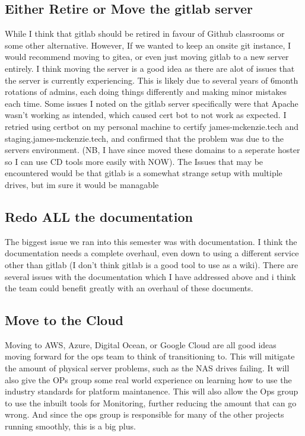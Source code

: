\documentclass{article}
\begin{document}
\subsection{Either Retire or Move the gitlab server}
While I think that gitlab should be retired in favour of Github classrooms or some other alternative. However, If we wanted to keep an onsite git instance, I would 
recommend moving to gitea, or even just moving gitlab to a new server entirely. I think moving the server is a good idea as there are alot of issues that the 
server is currently experiencing. This is likely due to several years of 6month rotations of admins, each doing things differently and making minor 
mistakes each time. Some issues I noted on the gitlab server specifically were that Apache wasn't working as intended, which caused cert bot to not work as
expected. I retried using certbot on my personal machine to certify james-mckenzie.tech and staging.james-mckenzie.tech, and confirmed that the problem was due to
the servers environment. (NB, I have since moved these domains to a seperate hoster so I can use CD tools more easily with NOW). The Issues that may be encountered
would be that gitlab is a somewhat strange setup with multiple drives, but im sure it would be managable

\subsection{Redo ALL the documentation}
The biggest issue we ran into this semester was with documentation. I think the documentation needs a complete overhaul, even down to using a different service other
than gitlab (I don't think gitlab is a good tool to use as a wiki). There are several issues with the documentation which I have addressed above and i think
the team could benefit greatly with an overhaul of these documents. 

\subsection{Move to the Cloud}
Moving to AWS, Azure, Digital Ocean, or Google Cloud are all good ideas moving forward for the ops team to think of transitioning to. This will mitigate the amount 
of physical server problems, such as the NAS drives failing. It will also give the OPs group some real world experience on learning how to use the industry
standards for platform maintanence. This will also allow the Ops group to use the inbuilt tools for Monitoring, further reducing the amount that can go wrong.
And since the ops group is responsible for many of the other projects running smoothly, this is a big plus. 
\end{document}
